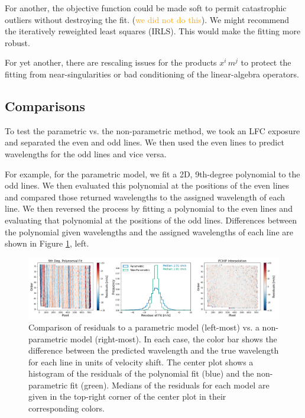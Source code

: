 \documentclass[12pt, letterpaper]{article}
\newcommand{\lz}[1]{\textcolor{orange}{#1}}
\begin{document}
For another, the objective function could be made soft to permit catastrophic outliers without destroying the fit. (\lz{we did not do this}).  We might recommend the iteratively reweighted least squares (IRLS).  This would make the fitting more robust.

For yet another, there are rescaling issues for the products $x^i\,m^j$ to protect the fitting from near-singularities or bad conditioning of the linear-algebra operators.

\subsection{Comparisons}
To test the parametric vs. the non-parametric method, we took an LFC exposure and separated the even and odd lines.  We then used the even lines to predict wavelengths for the odd lines and vice versa.

For example, for the parametric model, we fit a 2D, 9th-degree polynomial to the odd lines.  We then evaluated this polynomial at the positions of the even lines and compared those returned wavelengths to the assigned wavelength of each line.  We then reversed the process by fitting a polynomial to the even lines and evaluating that polynomial at the positions of the odd lines.  Differences between the polynomial given wavelengths and the assigned wavelengths of each line are shown in Figure \ref{fig:parametricTest}, left.

\begin{figure}[h]
\centering
\includegraphics[width=\textwidth]{Figures/parametricTest.png}
\caption{Comparison of residuals to a parametric model (left-most) vs. a non-parametric model (right-most).  In each case, the color bar shows the difference between the predicted wavelength and the true wavelength for each line in units of velocity shift.  The center plot shows a histogram of the residuals of the polynomial fit (blue) and the non-parametric fit (green).  Medians of the residuals for each model are given in the top-right corner of the center plot in their corresponding colors.}
\label{fig:parametricTest}
\end{figure}
\end{document}
